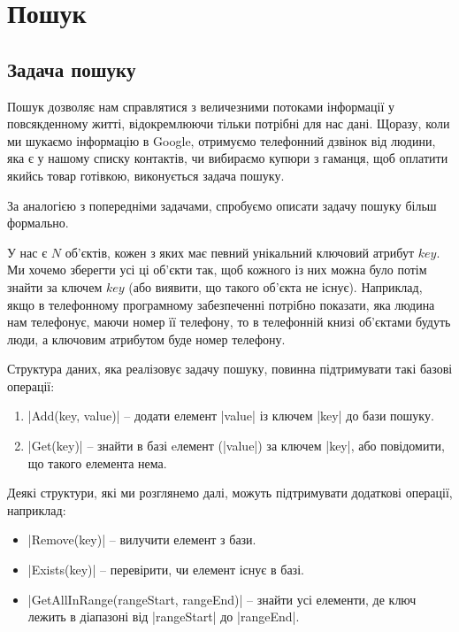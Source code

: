 \documentclass[12pt,a4paper]{report}
\begin{document}
\chapter{Пошук}

\begingroup
\let\clearpage\relax
\tableofcontents
\endgroup



\section{Задача пошуку}

Пошук дозволяє нам справлятися з величезними потоками інформації у повсякденному житті, відокремлюючи тільки потрібні для нас дані. Щоразу, коли ми шукаємо інформацію в Google, отримуємо телефонний дзвінок від людини, яка є у нашому списку контактів, чи вибираємо купюри з гаманця, щоб оплатити якийсь товар готівкою, виконується задача пошуку.

За аналогією з попередніми задачами, спробуємо описати задачу пошуку більш формально.

У нас є \(N\) об’єктів, кожен з яких має певний унікальний ключовий атрибут \(key\). Ми хочемо зберегти усі ці об’єкти так, щоб кожного із них можна було потім знайти за ключем \(key\) (або виявити, що такого об’єкта не існує). Наприклад, якщо в телефонному програмному забезпеченні потрібно показати, яка людина нам телефонує, маючи номер її телефону, то в телефонній книзі об’єктами будуть люди, а ключовим атрибутом буде номер телефону.

Структура даних, яка реалізовує задачу пошуку, повинна підтримувати такі базові операції:

\begin{enumerate}
    \item |Add(key, value)| -- додати елемент |value| із ключем |key| до бази пошуку.
    \item |Get(key)| -- знайти в базі eлемент (|value|) за ключем |key|, або повідомити, що такого елемента нема.
\end{enumerate}

Деякі структури, які ми розглянемо далі, можуть підтримувати додаткові операції, наприклад:
\begin{itemize}
    \item |Remove(key)| -- вилучити елемент з бази.
    \item |Exists(key)| -- перевірити, чи елемент існує в базі.
    \item |GetAllInRange(rangeStart, rangeEnd)| -- знайти усі елементи, де ключ лежить в діапазоні від |rangeStart| до |rangeEnd|.
\end{itemize}
\end{document}

